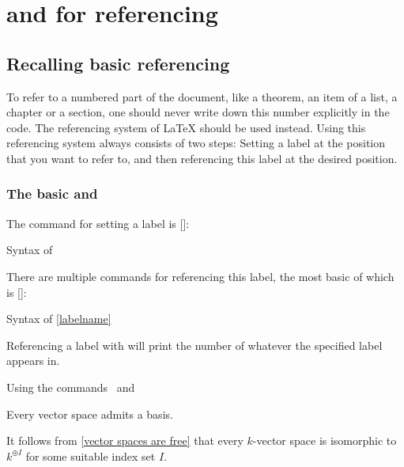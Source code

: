 \section{ and  for referencing}



\subsection{Recalling basic referencing}

To refer to a numbered part of the document, like a theorem, an item of a list, a chapter or a section, one should never write down this number explicitly in the code.
The referencing system of {\LaTeX} should be used instead.
Using this referencing system always consists of two steps:
Setting a label at the position that you want to refer to, and then referencing this label at the desired position.

\subsubsection{The basic  and }

The command for setting a label is [\comname]:
\begin{showcode}{Syntax of }
\label{labelname}
\end{showcode}
There are multiple commands for referencing this label, the most basic of which is [\comname]:
\begin{showcode}{Syntax of }
\ref{labelname}
\end{showcode}
Referencing a label with  will print the number of whatever the specified label appears in.
\begin{showlatex}{Using the commands~ and~}
\begin{theorem}
  \label{vector spaces are free}
  Every vector space admits a basis.
\end{theorem}
It follows from \ref{vector spaces are free} that every $k$-vector space is isomorphic to $k^{\oplus I}$ for some suitable index set $I$.
\end{showlatex}

